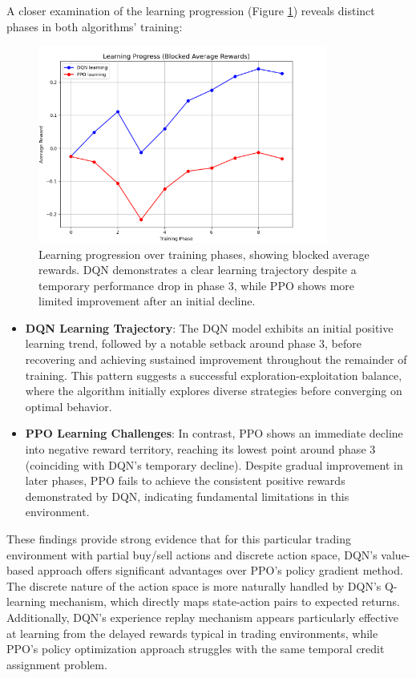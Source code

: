 \documentclass[11pt]{article}
\begin{document}
A closer examination of the learning progression (Figure \ref{fig:learning_progress}) reveals distinct phases in both algorithms' training:

\begin{figure}[h]
  \centering
  \includegraphics[width=0.85\textwidth]{fig/Learning Progress average reward.png}
  \caption{Learning progression over training phases, showing blocked average rewards. DQN demonstrates a clear learning trajectory despite a temporary performance drop in phase 3, while PPO shows more limited improvement after an initial decline.}
  \label{fig:learning_progress}
\end{figure}

\begin{itemize}
  \item \textbf{DQN Learning Trajectory}: The DQN model exhibits an initial positive learning trend, followed by a notable setback around phase 3, before recovering and achieving sustained improvement throughout the remainder of training. This pattern suggests a successful exploration-exploitation balance, where the algorithm initially explores diverse strategies before converging on optimal behavior.
  
  \item \textbf{PPO Learning Challenges}: In contrast, PPO shows an immediate decline into negative reward territory, reaching its lowest point around phase 3 (coinciding with DQN's temporary decline). Despite gradual improvement in later phases, PPO fails to achieve the consistent positive rewards demonstrated by DQN, indicating fundamental limitations in this environment.
\end{itemize}

These findings provide strong evidence that for this particular trading environment with partial buy/sell actions and discrete action space, DQN's value-based approach offers significant advantages over PPO's policy gradient method. The discrete nature of the action space is more naturally handled by DQN's Q-learning mechanism, which directly maps state-action pairs to expected returns. Additionally, DQN's experience replay mechanism appears particularly effective at learning from the delayed rewards typical in trading environments, while PPO's policy optimization approach struggles with the same temporal credit assignment problem.
\end{document}
